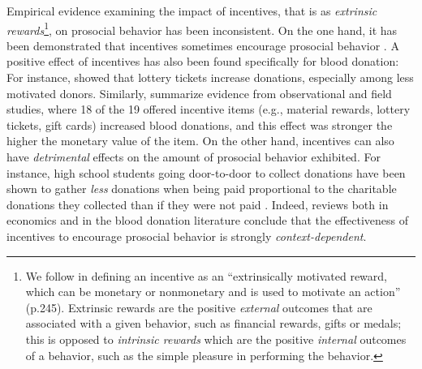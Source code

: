 \documentclass[AER]{AEA}
\begin{document}
Empirical evidence examining the impact of incentives, that is as \textit{extrinsic rewards}\footnote{We follow \cite{chell_systematic_2018} in defining an incentive as an “extrinsically motivated reward, which can be monetary or nonmonetary and is used to motivate an action” (p.245). Extrinsic rewards are the positive \textit{external} outcomes that are associated with a given behavior, such as financial rewards, gifts or medals; this is opposed to \textit{intrinsic rewards} which are the positive \textit{internal} outcomes of a behavior, such as the simple pleasure in performing the behavior.}, on prosocial behavior has been inconsistent. On the one hand, it has been demonstrated that incentives sometimes encourage prosocial behavior \cite[e.g., tax breaks increase charitable giving; ][]{duquette_tax_2016}. A positive effect of incentives has also been found specifically for blood donation: For instance, \cite{goette_blood_2020} showed that lottery tickets increase donations, especially among less motivated donors. Similarly, \cite{lacetera_economic_2013} summarize evidence from observational and field studies, where 18 of the 19 offered incentive items (e.g., material rewards, lottery tickets, gift cards) increased blood donations, and this effect was stronger the higher the monetary value of the item. On the other hand, incentives can also have \textit{detrimental} effects on the amount of prosocial behavior exhibited. For instance, high school students going door-to-door to collect donations have been shown to gather \textit{less} donations when being paid proportional to the charitable donations they collected than if they were not paid \citep{gneezy_pay_2000}. Indeed, reviews both in economics \citep{gneezy_when_2011} and in the blood donation literature \citep{chell_systematic_2018} conclude that the effectiveness of incentives to encourage prosocial behavior is strongly \textit{context-dependent}. 
\end{document}
